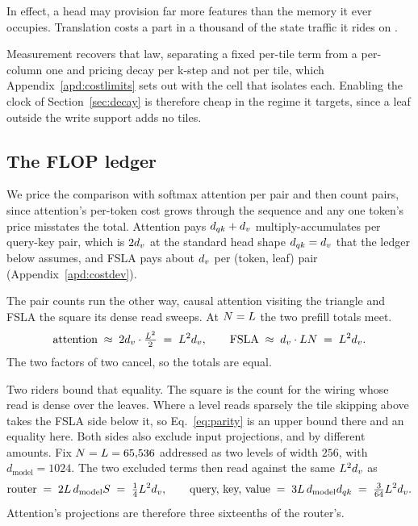 In effect, a head may provision far more features than the memory it ever occupies. Translation costs a part in a thousand of the state traffic it rides on .

Measurement recovers that law, separating a fixed per-tile term from a per-column one and pricing decay per k-step and not per tile, which Appendix~\ref{apd:costlimits} sets out with the cell that isolates each. Enabling the clock of Section~\ref{sec:decay} is therefore cheap in the regime it targets, since a leaf outside the write support adds no tiles.

\subsection{The FLOP ledger}
\label{sec:ledger}

We price the comparison with softmax attention per pair and then count pairs, since attention's per-token cost grows through the sequence and any one token's price misstates the total. Attention pays $d_{qk} + d_v$ multiply-accumulates per query-key pair, which is $2d_v$ at the standard head shape $d_{qk} = d_v$ that the ledger below assumes, and FSLA pays about $d_v$ per (token, leaf) pair (Appendix~\ref{apd:costdev}).

The pair counts run the other way, causal attention visiting the triangle and FSLA the square its dense read sweeps. At $N = L$ the two prefill totals meet.
\begin{align}
  \text{attention} \;\approx\; 2d_v \cdot \tfrac{L^2}{2} \;=\; L^2 d_v,
  \qquad
  \text{FSLA} \;\approx\; d_v \cdot LN \;=\; L^2 d_v .
  \label{eq:parity}
\end{align}
The two factors of two cancel, so the totals are equal.

Two riders bound that equality. The square is the count for the wiring whose read is dense over the leaves. Where a level reads sparsely the tile skipping above takes the FSLA side below it, so Eq.~\eqref{eq:parity} is an upper bound there and an equality here. Both sides also exclude input projections, and by different amounts. Fix $N = L = 65{,}536$ addressed as two levels of width $256$, with $d_{\mathrm{model}} = 1024$. The two excluded terms then read against the same $L^2 d_v$ as
\begin{align}
  \text{router} \;=\; 2 L\, d_{\mathrm{model}} S \;=\; \tfrac{1}{4} L^2 d_v,
  \qquad
  \text{query, key, value} \;=\; 3 L\, d_{\mathrm{model}} d_{qk} \;=\; \tfrac{3}{64} L^2 d_v .
\end{align}
Attention's projections are therefore three sixteenths of the router's.

